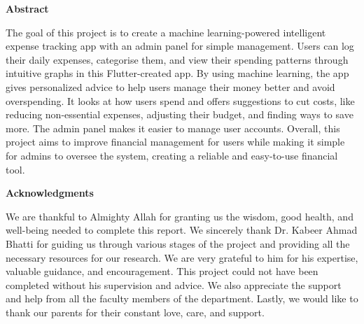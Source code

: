 \documentclass[12pt]{article}
\begin{document}
\begin{center}
    \Large \textbf{Abstract}
\end{center}

\vspace{1.5cm} %

\noindent
The goal of this project is to create a machine learning-powered intelligent expense tracking app with an admin panel for simple management. Users can log their daily expenses, categorise them, and view their spending patterns through intuitive graphs in this Flutter-created app. By using machine learning, the app gives personalized advice to help users manage their money better and avoid overspending. It looks at how users spend and offers suggestions to cut costs, like reducing non-essential expenses, adjusting their budget, and finding ways to save more. The admin panel makes it easier to manage user accounts. Overall, this project aims to improve financial management for users while making it simple for admins to oversee the system, creating a reliable and easy-to-use financial tool.


\pagestyle{plain} %

\newpage
\setcounter{page}{1} %

\vspace*{3cm} %

\begin{flushleft}
    \Large \textbf{Acknowledgments}
\end{flushleft}

\vspace{1cm} %

\noindent
We are thankful to Almighty Allah for granting us the wisdom, good health, and well-being needed to complete this report. We sincerely thank Dr. Kabeer Ahmad Bhatti for guiding us through various stages of the project and providing all the necessary resources for our research. We are very grateful to him for his expertise, valuable guidance, and encouragement. This project could not have been completed without his supervision and advice. We also appreciate the support and help from all the faculty members of the department. Lastly, we would like to thank our parents for their constant love, care, and support.
\end{document}
